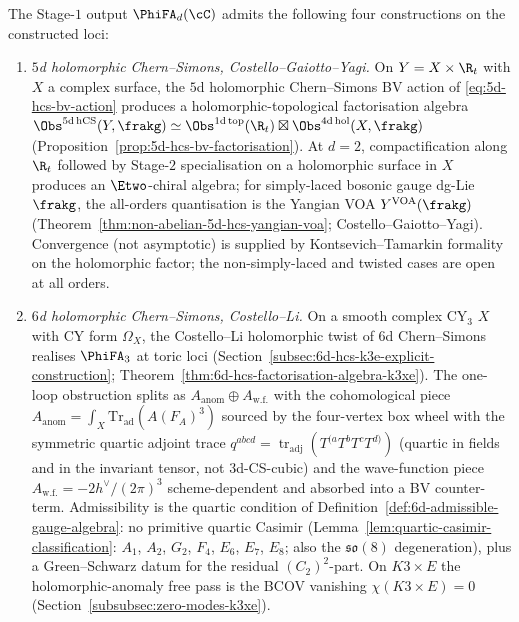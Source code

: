 \begin{definition}
\label{def:four-physical-lanes-stage-1}
The Stage-$1$ output $\PhiFA_d(\cC)$ admits the following four
constructions on the constructed loci:
\begin{enumerate}[label=\textup{(L\arabic*)},leftmargin=2em,itemsep=2pt]
\item[(L1)] \emph{$5$d holomorphic Chern--Simons,
Costello--Gaiotto--Yagi.} On $Y = X \times \R_t$ with $X$ a complex
surface, the $5$d holomorphic Chern--Simons BV action of
\eqref{eq:5d-hcs-bv-action} produces a holomorphic-topological
factorisation algebra
$\Obs^{5\mathrm{d\,hCS}}(Y, \frakg) \simeq \Obs^{1\mathrm{d\,top}}(\R_t)
\boxtimes \Obs^{4\mathrm{d\,hol}}(X, \frakg)$
(Proposition~\ref{prop:5d-hcs-bv-factorisation}). At $d = 2$,
compactification along $\R_t$ followed by Stage-$2$ specialisation on a
holomorphic surface in $X$ produces an $\Etwo$-chiral algebra; for
simply-laced bosonic gauge dg-Lie $\frakg$, the all-orders
quantisation is the Yangian VOA
$Y^{\mathrm{VOA}}(\frakg)$
(Theorem~\ref{thm:non-abelian-5d-hcs-yangian-voa};
Costello--Gaiotto--Yagi). Convergence (not asymptotic) is supplied by
Kontsevich--Tamarkin formality on the holomorphic factor; the
non-simply-laced and twisted cases are open at all orders.

\item[(L2)] \emph{$6$d holomorphic Chern--Simons,
Costello--Li.} On a smooth complex CY$_3$ $X$ with CY form
$\Omega_X$, the Costello--Li holomorphic twist of $6$d Chern--Simons
realises $\PhiFA_3$ at toric loci
(Section~\ref{subsec:6d-hcs-k3e-explicit-construction};
Theorem~\ref{thm:6d-hcs-factorisation-algebra-k3xe}). The
one-loop obstruction splits as
$A_{\mathrm{anom}} \oplus A_{\mathrm{w.f.}}$ with the cohomological
piece $A_{\mathrm{anom}} = \int_X \mathrm{Tr}_{\mathrm{ad}}(A(F_A)^3)$
sourced by the four-vertex box wheel with the symmetric quartic
adjoint trace
$q^{abcd} = \operatorname{tr}_{\mathrm{adj}}(T^{(a}T^bT^cT^{d)})$
(quartic in fields and in the invariant tensor, not $3$d-CS-cubic)
and the wave-function piece
$A_{\mathrm{w.f.}} = -2 h^\vee/(2\pi)^3$ scheme-dependent and
absorbed into a BV counter-term. Admissibility is the quartic
condition of Definition~\ref{def:6d-admissible-gauge-algebra}: no
primitive quartic Casimir
(Lemma~\ref{lem:quartic-casimir-classification}: $A_1$, $A_2$, $G_2$,
$F_4$, $E_6$, $E_7$, $E_8$; also the $\mathfrak{so}(8)$
degeneration), plus a Green--Schwarz datum for the residual
$(C_2)^2$-part. On $K3 \times E$ the
holomorphic-anomaly free pass is the BCOV vanishing $\chi(K3 \times E) = 0$
(Section~\ref{subsubsec:zero-modes-k3xe}).


\end{enumerate}
\end{definition}
